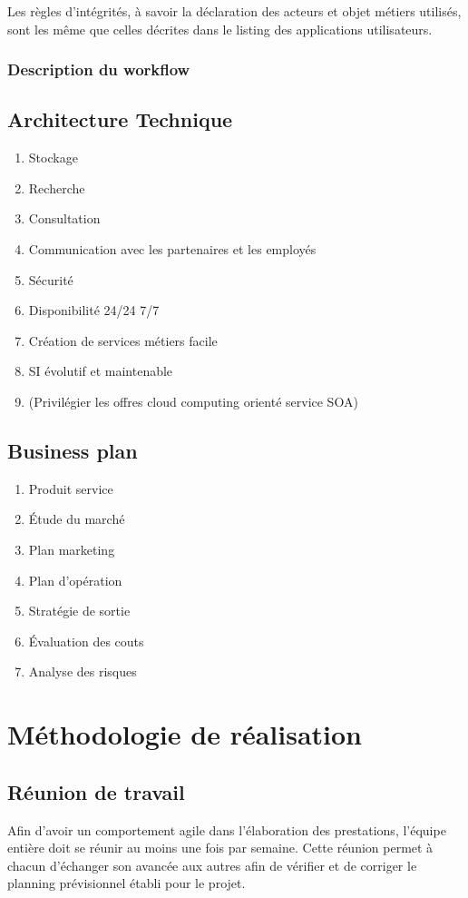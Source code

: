 Les règles d'intégrités, à savoir la déclaration des acteurs et objet métiers
utilisés, sont les même que celles décrites dans le listing des applications
utilisateurs. \\

\subsubsection{Description du workflow}

\subsection{Architecture Technique}
\begin{enumerate}
  \item Stockage
  \item Recherche
  \item Consultation
  \item Communication avec les partenaires et les employés
  \item Sécurité
  \item Disponibilité 24/24 7/7
  \item Création de services métiers facile
  \item SI évolutif et maintenable
  \item (Privilégier les offres cloud computing orienté service SOA)
\end{enumerate}

\subsection{Business plan}
\begin{enumerate}
  \item Produit service
  \item Étude du marché
  \item Plan marketing
  \item Plan d'opération
  \item Stratégie de sortie
  \item Évaluation des couts
  \item Analyse des risques
\end{enumerate}

\section{Méthodologie de réalisation}
\subsection{Réunion de travail}
Afin d'avoir un comportement agile dans l'élaboration des prestations, l'équipe
entière doit se réunir au moins une fois par semaine. Cette réunion permet à
chacun d'échanger son avancée aux autres afin de vérifier et de corriger le
planning prévisionnel établi pour le projet. \\

